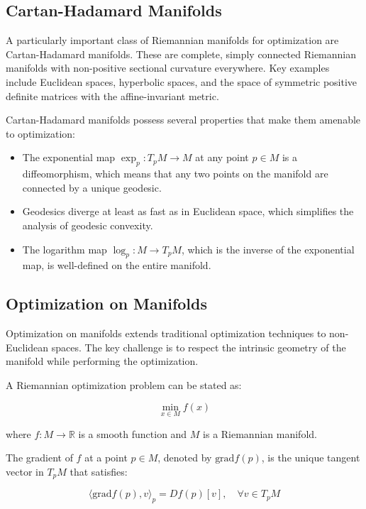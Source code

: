 \subsection{Cartan-Hadamard Manifolds}

A particularly important class of Riemannian manifolds for optimization are Cartan-Hadamard manifolds. These are complete, simply connected Riemannian manifolds with non-positive sectional curvature everywhere. Key examples include Euclidean spaces, hyperbolic spaces, and the space of symmetric positive definite matrices with the affine-invariant metric.

Cartan-Hadamard manifolds possess several properties that make them amenable to optimization:

\begin{itemize}
\item The exponential map $\exp_p: T_p M \rightarrow M$ at any point $p \in M$ is a diffeomorphism, which means that any two points on the manifold are connected by a unique geodesic.
\item Geodesics diverge at least as fast as in Euclidean space, which simplifies the analysis of geodesic convexity.
\item The logarithm map $\log_p: M \rightarrow T_p M$, which is the inverse of the exponential map, is well-defined on the entire manifold.
\end{itemize}

\subsection{Optimization on Manifolds}

Optimization on manifolds extends traditional optimization techniques to non-Euclidean spaces. The key challenge is to respect the intrinsic geometry of the manifold while performing the optimization.

A Riemannian optimization problem can be stated as:

\begin{equation}
\min_{x \in M} f(x)
\end{equation}

where $f: M \rightarrow \mathbb{R}$ is a smooth function and $M$ is a Riemannian manifold.

The gradient of $f$ at a point $p \in M$, denoted by $\text{grad} f(p)$, is the unique tangent vector in $T_p M$ that satisfies:

\begin{equation}
\langle \text{grad} f(p), v \rangle_p = D f(p)[v], \quad \forall v \in T_p M
\end{equation}

